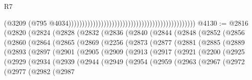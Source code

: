 \begin{lexlean}{R7}
\begin{coremodule}
                                                                                              (@3209
                                                                                                (@795
                                                                                                  @4034)))))))))))))))))))))))))))))))))))))))))))))))
@4130 := @2816
    (@2820
      (@2824
        (@2828
          (@2832
            (@2836
              (@2840
                (@2844
                  (@2848
                    (@2852
                      (@2856
                        (@2860
                          (@2864
                            (@2865
                              (@2869
                                (@2256
                                  (@2873
                                    (@2877
                                      (@2881
                                        (@2885
                                          (@2889
                                            (@2893
                                              (@2897
                                                (@2901
                                                  (@2905
                                                    (@2909
                                                      (@2913
                                                        (@2917
                                                          (@2921
                                                            (@2200
                                                              (@2925
                                                                (@2929
                                                                  (@2934
                                                                    (@2939
                                                                      (@2944
                                                                        (@2949
                                                                          (@2954
                                                                            (@2959
                                                                              (@2963
                                                                                (@2967
                                                                                  (@2972
                                                                                    (@2977
                                                                                      (@2982
                                                                                        (@2987

\end{coremodule}
\end{lexlean}
